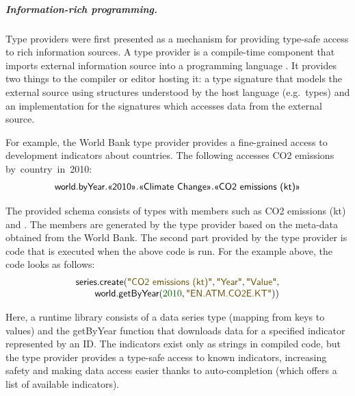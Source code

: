 \documentclass[a4paper,UKenglish]{lipics-v2016}
\theoremstyle{plain}
\theoremstyle{definition}
\newcommand{\num}[1]{\textcolor{numclr}{#1}}
\newcommand{\str}[1]{\textnormal{\textcolor{strclr}{\sffamily "#1"}}}
\newcommand{\ident}[1]{\textnormal{\sffamily #1}}
\newcommand{\qident}[1]{\textnormal{\sffamily \guillemotleft #1\guillemotright}}
\begin{document}
\subparagraph{Information-rich programming.} Type providers were first presented as a mechanism
for providing type-safe access to rich information sources. A type provider is a compile-time 
component that imports external information source into a programming language \cite{inforich}. It provides two 
things to the compiler or editor hosting it: a type signature that models the external source 
using structures understood by the host language (e.g.~types) and an implementation for the 
signatures which accesses data from the external source.

For example, the World Bank type provider \cite{ageweb} provides a fine-grained access to development 
indicators about countries. The following accesses CO2 emissions by~country~in~2010:
%
\begin{equation*}
\begin{array}{l}
\ident{world}.\ident{byYear}.\qident{2010}.\qident{Climate Change}.\qident{CO2 emissions (kt)}
\end{array}
\end{equation*}

\noindent
The provided schema consists of types with members such as \qident{CO2 emissions (kt)} and \qident{2010}.
The members are generated by the type provider based on the meta-data obtained from the World Bank.
The second part provided by the type provider is code that is executed when the above code is run.
For the example above, the code looks as follows:
%
\begin{equation*}
\begin{array}{l}
\ident{series.create}(\str{CO2 emissions (kt)},\str{Year},\str{Value},\\
\qquad \ident{world.getByYear}(\num{2010},\str{EN.ATM.CO2E.KT}))
\end{array}
\end{equation*}

\noindent
Here, a runtime library consists of a data series type (mapping from keys to values) and the 
\ident{getByYear} function that downloads data for a specified indicator represented by an ID. 
The indicators exist only as strings in compiled code, but the type provider provides a 
type-safe access to known indicators, increasing safety and making data access easier thanks 
to auto-completion (which offers a list of available indicators).
\end{document}
